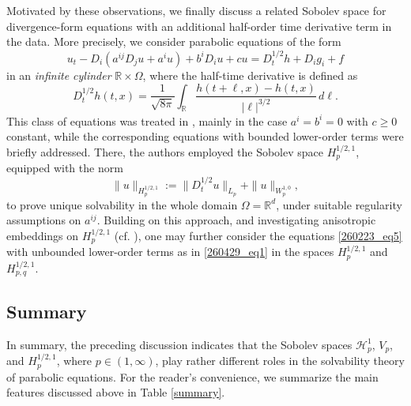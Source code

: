 \documentclass[reqno]{amsart}
\numberwithin{equation}{section}
\theoremstyle{plain}
\theoremstyle{definition}
\def\bR{\mathbb{R}}
\def\cH{\mathcal{H}}
\begin{document}
Motivated by these observations, we finally discuss a related Sobolev space for divergence-form equations with an additional half-order time derivative term in the data.
More precisely, we consider parabolic equations of the form 
 \begin{equation}		\label{260223_eq5}
u_t-D_i(a^{ij}D_j u+a^iu)+b^iD_iu+cu=D_{t}^{1/2}h+D_i g_i+f
\end{equation}
in an {\em infinite cylinder} $\bR\times \Omega$, where the half-time derivative is defined as
$$
D_t^{1/2}h(t,x)=\frac{1}{\sqrt{8\pi}} \int_{\bR} \frac{h(t+\ell, x)-h(t,x)}{|\ell|^{3/2}}\,d\ell.
$$
This class of equations was treated in \cite{MR4920684, MR0200593}, mainly in the case $a^i=b^i=0$ with $c\ge 0$ constant, while the corresponding equations with bounded lower-order terms were briefly addressed.
There, the authors employed the Sobolev space $H^{1/2, 1}_p$, equipped with the norm
$$
\|u\|_{H^{1/2, 1}_p}:=\|D_t^{1/2}u\|_{L_p}+\|u\|_{W^{1,0}_p},
$$
to prove unique solvability
in the whole domain $\Omega=\bR^d$, under suitable regularity assumptions on $a^{ij}$.
Building on this approach, and investigating anisotropic embeddings on $H^{1/2,1}_p$ (cf. \cite[Appendix]{MR4387945}),
one may further consider the equations \eqref{260223_eq5} with unbounded lower-order terms as in \eqref{260429_eq1} in the spaces $H^{1/2,1}_p$ and $H^{1/2,1}_{p,q}$.


\subsection{Summary}	\label{S1_5}

In summary, the preceding discussion indicates that the Sobolev spaces $\cH^1_p$, $V_p$, and $H^{1/2,1}_p$, where $p\in (1, \infty)$, play rather different roles in the solvability theory of parabolic equations.
For the reader's convenience, we summarize the main features discussed above in Table \ref{summary}.
\end{document}
